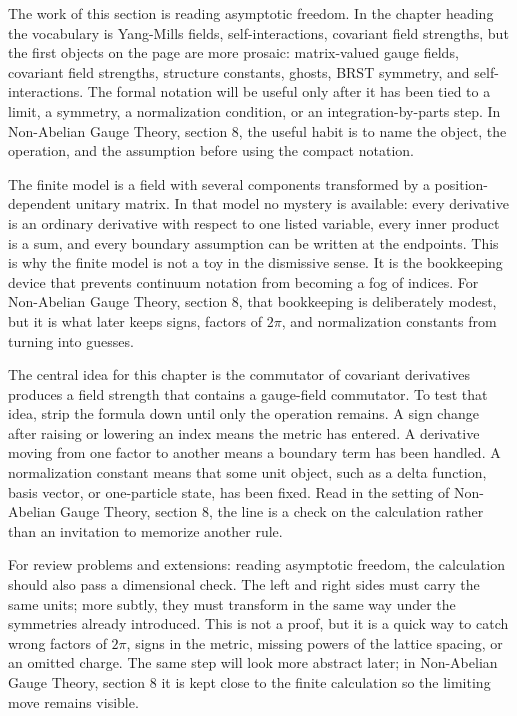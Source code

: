 The work of this section is reading asymptotic freedom.  In the chapter heading the vocabulary is Yang-Mills fields, self-interactions, covariant field strengths, but the first objects on the page are more prosaic: matrix-valued gauge fields, covariant field strengths, structure constants, ghosts, BRST symmetry, and self-interactions.  The formal notation will be useful only after it has been tied to a limit, a symmetry, a normalization condition, or an integration-by-parts step.  In Non-Abelian Gauge Theory, section 8, the useful habit is to name the object, the operation, and the assumption before using the compact notation.

The finite model is a field with several components transformed by a position-dependent unitary matrix.  In that model no mystery is available: every derivative is an ordinary derivative with respect to one listed variable, every inner product is a sum, and every boundary assumption can be written at the endpoints.  This is why the finite model is not a toy in the dismissive sense.  It is the bookkeeping device that prevents continuum notation from becoming a fog of indices.  For Non-Abelian Gauge Theory, section 8, that bookkeeping is deliberately modest, but it is what later keeps signs, factors of \(2\pi\), and normalization constants from turning into guesses.

The central idea for this chapter is the commutator of covariant derivatives produces a field strength that contains a gauge-field commutator.  To test that idea, strip the formula down until only the operation remains.  A sign change after raising or lowering an index means the metric has entered.  A derivative moving from one factor to another means a boundary term has been handled.  A normalization constant means that some unit object, such as a delta function, basis vector, or one-particle state, has been fixed.  Read in the setting of Non-Abelian Gauge Theory, section 8, the line is a check on the calculation rather than an invitation to memorize another rule.

For review problems and extensions: reading asymptotic freedom, the calculation should also pass a dimensional check.  The left and right sides must carry the same units; more subtly, they must transform in the same way under the symmetries already introduced.  This is not a proof, but it is a quick way to catch wrong factors of \(2\pi\), signs in the metric, missing powers of the lattice spacing, or an omitted charge.  The same step will look more abstract later; in Non-Abelian Gauge Theory, section 8 it is kept close to the finite calculation so the limiting move remains visible.

